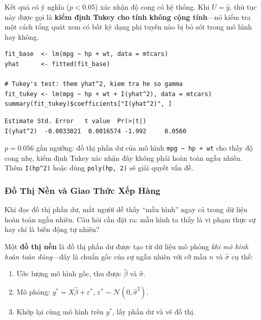 Kết quả có ý nghĩa ($p < 0.05$) xác nhận độ cong có hệ thống. Khi $U = \hat{y}$, thủ tục này được gọi là \textbf{kiểm định Tukey cho tính không cộng tính}---nó kiểm tra một cách tổng quát xem có bất kỳ dạng phi tuyến nào bị bỏ sót trong mô hình hay không.

\begin{lstlisting}[style=Rstyle]
fit_base  <- lm(mpg ~ hp + wt, data = mtcars)
yhat      <- fitted(fit_base)

# Tukey's test: them yhat^2, kiem tra he so gamma
fit_tukey <- lm(mpg ~ hp + wt + I(yhat^2), data = mtcars)
summary(fit_tukey)$coefficients["I(yhat^2)", ]
\end{lstlisting}

\begin{lstlisting}[style=output]
              Estimate Std. Error   t value  Pr(>|t|)
I(yhat^2)  -0.0033021  0.0016574 -1.992     0.0560
\end{lstlisting}

$p = 0.056$ gần ngưỡng: đồ thị phần dư của mô hình \texttt{mpg \textasciitilde{} hp + wt} cho thấy độ cong nhẹ, kiểm định Tukey xác nhận đây không phải hoàn toàn ngẫu nhiên. Thêm \texttt{I(hp\^{}2)} hoặc dùng \texttt{poly(hp, 2)} sẽ giải quyết vấn đề.

\subsubsection{Đồ Thị Nền và Giao Thức Xếp Hàng}

Khi đọc đồ thị phần dư, mắt người dễ thấy ``mẫu hình'' ngay cả trong dữ liệu hoàn toàn ngẫu nhiên. Câu hỏi cần đặt ra: mẫu hình ta thấy là vi phạm thực sự hay chỉ là biến động tự nhiên?

Một \textbf{đồ thị nền} là đồ thị phần dư được tạo từ dữ liệu mô phỏng \textit{khi mô hình hoàn toàn đúng}---đây là chuẩn gốc của sự ngẫu nhiên với cỡ mẫu $n$ và $\hat{\sigma}$ cụ thể:
\begin{enumerate}
  \item Ước lượng mô hình gốc, thu được $\hat{\beta}$ và $\hat{\sigma}$.
  \item Mô phỏng: $y^* = X\hat{\beta} + \varepsilon^*$, $\varepsilon^* \sim \mathcal{N}(0, \hat{\sigma}^2)$.
  \item Khớp lại cùng mô hình trên $y^*$, lấy phần dư và vẽ đồ thị.
\end{enumerate}

